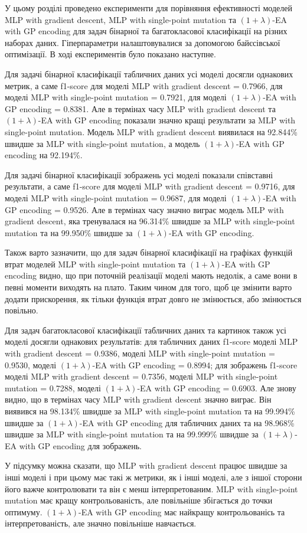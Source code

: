 \chapconclude{\ref{chap:practice}}

У цьому розділі проведено експерименти для порівняння ефективності моделей MLP with gradient descent, MLP with single-point mutation та $(1+\lambda)$-EA with GP encoding для задач бінарної та багатокласової класифікації на різних наборах даних. Гіперпараметри налаштовувалися за допомогою байєсівської оптимізації. В ході експериментів було показано наступне.

Для задачі бінарної класифікації табличних даних усі моделі досягли однакових метрик, а саме f1-score для моделі MLP with gradient descent = 0.7966, для моделі MLP with single-point mutation = 0.7921, для моделі $(1+\lambda)$-EA with GP encoding = 0.8381. Але в термінах часу MLP with gradient descent та $(1+\lambda)$-EA with GP encoding показали значно кращі результати за MLP with single-point mutation. Модель MLP with gradient descent виявилася на 92.844\% швидше за MLP with single-point mutation, а модель $(1+\lambda)$-EA with GP encoding на 92.194\%. 

Для задачі бінарної класифікації зображень усі моделі показали співставні результати, а саме f1-score для моделі MLP with gradient descent = 0.9716, для моделі MLP with single-point mutation = 0.9687, для моделі $(1+\lambda)$-EA with GP encoding = 0.9526. Але в термінах часу значно виграє модель MLP with gradient descent, яка тренувалася на 96.314\% швидше за MLP with single-point mutation та на 99.950\% швидше за $(1+\lambda)$-EA with GP encoding.

Також варто зазначити, що для задач бінарної класифікації на графіках функцій втрат моделей MLP with single-point mutation та $(1+\lambda)$-EA with GP encoding видно, що при поточній реалізації моделі мають недолік, а саме вони в певні моменти виходять на плато. Таким чином для того, щоб це змінити варто додати прискорення, як тільки функція втрат довго не змінюється, або змінюється повільно.

Для задач багатокласової класифікації табличних даних та картинок також усі моделі досягли однакових результатів: для табличних даних f1-score моделі MLP with gradient descent = 0.9386, моделі MLP with single-point mutation = 0.9530, моделі $(1+\lambda)$-EA with GP encoding = 0.8994; для зображень f1-score моделі MLP with gradient descent = 0.7356, моделі MLP with single-point mutation = 0.7288, моделі $(1+\lambda)$-EA with GP encoding = 0.6903. Але знову видно, що в термінах часу MLP with gradient descent значно виграє. Він виявився на 98.134\% швидше за MLP with single-point mutation та на 99.994\% швидше за $(1+\lambda)$-EA with GP encoding для табличних даних та на 98.968\% швидше за MLP with single-point mutation та на 99.999\% швидше за $(1+\lambda)$-EA with GP encoding для зображень.

У підсумку можна сказати, що MLP with gradient descent працює швидше за інші моделі і при цьому має такі ж метрики, як і інші моделі, але з іншої сторони його важче контролювати та він є менш інтерпретованим. MLP with single-point mutation має кращу контрольованість, але повільніше збігається до точки оптимуму. $(1+\lambda)$-EA with GP encoding має найкращу контрольованісь та інтерпретованість, але значно повільніше навчається.